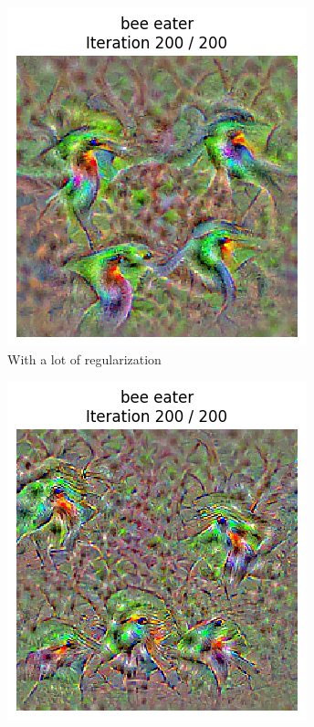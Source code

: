 \begin{figure}[H]
    \centering
    \begin{subfigure}[t]{.33\textwidth}
        \centering
        \includegraphics[width=\linewidth]{SqueezeNet/SqueezeNet_bird_animated_reg++_last_frame.png}
        \caption{With a lot of regularization}
        \label{fig:class_viz_reg:sub1}
    \end{subfigure}%
    \begin{subfigure}[t]{.33\textwidth}
        \centering
        \includegraphics[width=\linewidth]{SqueezeNet/SqueezeNet_bird_animated_last_frame.png}

\end{subfigure}
\end{figure}
